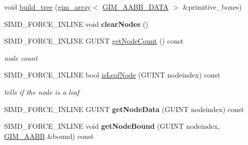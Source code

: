 \textbf{ }\par
\begin{DoxyCompactItemize}
\item 
void \hyperlink{classGIM__BOX__TREE_af76fa1d2f5e20c8979120fa72cf7575f}{build\+\_\+tree} (\hyperlink{classgim__array}{gim\+\_\+array}$<$ \hyperlink{structGIM__AABB__DATA}{G\+I\+M\+\_\+\+A\+A\+B\+B\+\_\+\+D\+A\+TA} $>$ \&primitive\+\_\+boxes)
\item 
\mbox{\label{classGIM__BOX__TREE_aa016c5ef3669d464ed15eb18b7308b62}} 
S\+I\+M\+D\+\_\+\+F\+O\+R\+C\+E\+\_\+\+I\+N\+L\+I\+NE void {\bfseries clear\+Nodes} ()
\item 
\mbox{\label{classGIM__BOX__TREE_ae5ee83e6bf9ba2d96cbbb9d7ecc20b40}} 
S\+I\+M\+D\+\_\+\+F\+O\+R\+C\+E\+\_\+\+I\+N\+L\+I\+NE G\+U\+I\+NT \hyperlink{classGIM__BOX__TREE_ae5ee83e6bf9ba2d96cbbb9d7ecc20b40}{get\+Node\+Count} () const
\begin{DoxyCompactList}\small\item\em node count \end{DoxyCompactList}\item 
\mbox{\label{classGIM__BOX__TREE_ac7fc7775379fc52f52eee28a81e22f05}} 
S\+I\+M\+D\+\_\+\+F\+O\+R\+C\+E\+\_\+\+I\+N\+L\+I\+NE bool \hyperlink{classGIM__BOX__TREE_ac7fc7775379fc52f52eee28a81e22f05}{is\+Leaf\+Node} (G\+U\+I\+NT nodeindex) const
\begin{DoxyCompactList}\small\item\em tells if the node is a leaf \end{DoxyCompactList}\item 
\mbox{\label{classGIM__BOX__TREE_acfba452c43dcb2687a1d3351c2018fe0}} 
S\+I\+M\+D\+\_\+\+F\+O\+R\+C\+E\+\_\+\+I\+N\+L\+I\+NE G\+U\+I\+NT {\bfseries get\+Node\+Data} (G\+U\+I\+NT nodeindex) const
\item 
\mbox{\label{classGIM__BOX__TREE_a6c4cfc0acab435c1407f9621c6d31777}} 
S\+I\+M\+D\+\_\+\+F\+O\+R\+C\+E\+\_\+\+I\+N\+L\+I\+NE void {\bfseries get\+Node\+Bound} (G\+U\+I\+NT nodeindex, \hyperlink{classGIM__AABB}{G\+I\+M\+\_\+\+A\+A\+BB} \&bound) const
\item 
\mbox{\label{classGIM__BOX__TREE_a910f36323977e36f0e911a09b47fe582}} 

\end{DoxyCompactItemize}
